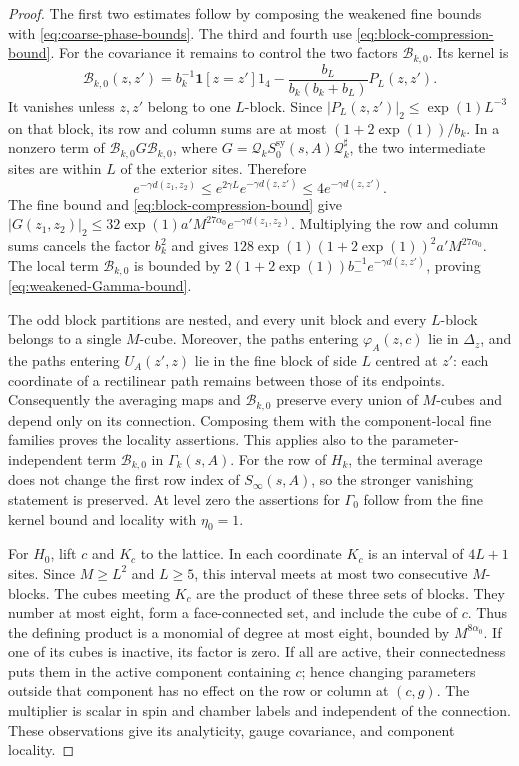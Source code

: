 \begin{proof}
The first two estimates follow by composing the weakened fine bounds
with \eqref{eq:coarse-phase-bounds}. The third and fourth use
\eqref{eq:block-compression-bound}. For the covariance it remains to
control the two factors $\mathcal B_{k,0}$. Its kernel is
\[
 \mathcal B_{k,0}(z,z')=b_k^{-1}\mathbf1[z=z']1_4
      -\frac{b_L}{b_k(b_k+b_L)}P_L(z,z').
\]
It vanishes unless $z,z'$ belong to one $L$-block. Since
$|P_L(z,z')|_2\le\exp(1)L^{-3}$ on that block, its row and column sums
are at most $(1+2\exp(1))/b_k$. In a nonzero term of
$\mathcal B_{k,0}G\mathcal B_{k,0}$,
where $G=\mathcal Q_kS_0^{\mathrm{sy}}(s,A)\mathcal Q_k^\sharp$,
the two intermediate sites are within $L$ of the exterior sites.
Therefore
\[
 e^{-\gamma d(z_1,z_2)}\le
      e^{2\gamma L}e^{-\gamma d(z,z')}
      \le4e^{-\gamma d(z,z')}.
\]
The fine bound and \eqref{eq:block-compression-bound} give
$|G(z_1,z_2)|_2\le32\exp(1)a'M^{27\alpha_0}e^{-\gamma d(z_1,z_2)}$.
Multiplying the row and column sums cancels the factor $b_k^2$ and
gives $128\exp(1)(1+2\exp(1))^2a'M^{27\alpha_0}$.
The local term $\mathcal B_{k,0}$ is bounded by
$2(1+2\exp(1))b_-^{-1}e^{-\gamma d(z,z')}$, proving
\eqref{eq:weakened-Gamma-bound}.

The odd block partitions are nested, and every unit block and every
$L$-block belongs to a single $M$-cube. Moreover, the paths entering
$\varphi_A(z,c)$ lie in $\Delta_z$, and the paths entering
$U_A(z',z)$ lie in the fine block of side $L$ centred at $z'$:
each coordinate of a rectilinear path remains between those of its
endpoints. Consequently the averaging maps and $\mathcal B_{k,0}$
preserve every union of $M$-cubes and depend only on its connection.
Composing them with the component-local fine families proves the
locality assertions. This applies also to the parameter-independent
term $\mathcal B_{k,0}$ in $\Gamma_k(s,A)$.
For the row of $H_k$, the terminal average does not change the first
row index of $S_\infty(s,A)$, so the stronger vanishing statement is
preserved. At level zero the assertions for $\Gamma_0$ follow
from the fine kernel bound and locality with $\eta_0=1$.

For $H_0$, lift $c$ and $K_c$ to the lattice. In each coordinate
$K_c$ is an interval of $4L+1$ sites. Since $M\ge L^2$ and $L\ge5$,
this interval meets at most two consecutive $M$-blocks. The cubes
meeting $K_c$ are the product of these three sets of blocks.
They number at most eight, form a face-connected set, and include
the cube of $c$. Thus the defining product is a monomial of degree
at most eight, bounded by $M^{8\alpha_0}$. If one of its cubes is
inactive, its factor is zero. If all are active, their connectedness
puts them in the active component containing $c$; hence changing
parameters outside that component has no effect on the row or
column at $(c,g)$. The multiplier is scalar in spin and chamber
labels and independent of the connection. These observations give
its analyticity, gauge covariance, and component locality.
\end{proof}

